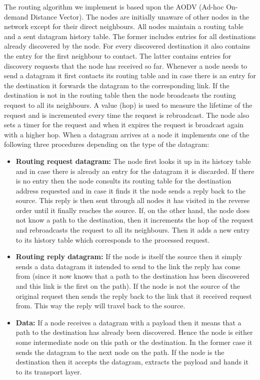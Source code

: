 \documentclass[11pt,a4paper,oneside]{report}
\begin{document}
The routing algorithm we implement is based upon the AODV (Ad-hoc On-demand
Distance Vector). The nodes are initially unaware of other nodes in the network except 
for their direct neighbours. All nodes maintain a
routing table and a sent datagram history table. The former includes entries for
all destinations already discovered by the node. For every discovered
destination it also contains the entry for the first neighbour to contact. The
latter contains entries for discovery requests that the node has received so
far. Whenever a node needs to send a datagram it first contacts its 
routing table and in case there is an entry for the destination it forwards the 
datagram to the corresponding link. If the destination is not in the routing table
then the node broadcasts the routing request to all its neighbours. A value (hop) is used to
measure the lifetime of the request and is incremented every time the request is
rebroadcast. The node also sets a timer for the request and when it expires the request
is broadcast again with a higher hop. When a datagram arrives at a node it implements 
one of the following three procedures depending on the type of the datagram:
\begin{itemize}
\item \noindent \textbf{Routing request datagram:}
The node first looks it up in its history table and in case there
is already an entry for the datagram it is discarded. If there is no entry then the node 
consults its routing table for the destination address requested and in case it finds it 
the node sends a reply back to the source. This reply is then sent through all nodes it 
has visited in the reverse order until it finally reaches the source. If, on the other hand,
the node does not know a path to the destination, then it increments the hop of the request 
and rebroadcasts the request to all its neighbours. Then it adds a new entry to its history
table which corresponds to the processed request.

\item \noindent \textbf{Routing reply datagram:}
  If the node is itself the source then it simply sends a data datagram it intended to send to the link
the reply has come from (since it now knows that a path to the destination has been discovered and 
this link is the first on the path). If the node is not the source of the original request then
 sends the reply back to the link that it received request from. This way the reply will travel back to
the source.  

\item \noindent \textbf{Data:}
  If a node receives a datagram with a payload then it means that a path to the destination has
already been discovered. Hence the node is either some intermediate node on this path or the 
destination. In the former case it sends the datagram to the next node on the path. If the 
node is the destination then it accepts the datagram, extracts the payload and hands it 
to its transport layer.
\end{itemize}
\end{document}
